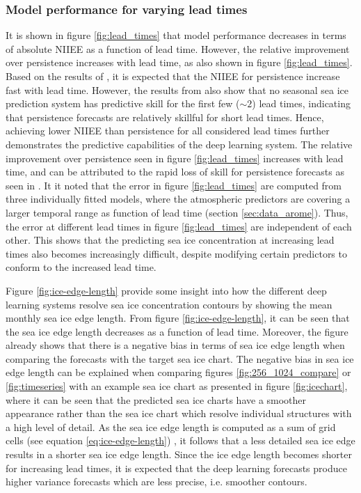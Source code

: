 \documentclass[../main/thesis]{subfiles}
\begin{document}
\subsubsection{Model performance for varying lead times}
\label{sec:discuss_perf_leadtimes}
It is shown in figure \ref{fig:lead_times} that model performance decreases in terms of absolute NIIEE as a function of lead time. However, the relative improvement over persistence increases with lead time, as also shown in figure \ref{fig:lead_times}. Based on the results of \citet{Zampieri2019}, it is expected that the NIIEE for persistence increase fast with lead time. However, the results from \citet{Zampieri2019} also show that no seasonal sea ice prediction system has predictive skill for the first few ($\sim 2$) lead times, indicating that persistence forecasts are relatively skillful for short lead times. Hence, achieving lower NIIEE than persistence for all considered lead times further demonstrates the predictive capabilities of the deep learning system. The relative improvement over persistence seen in figure \ref{fig:lead_times} increases with lead time, and can be attributed to the rapid loss of skill for persistence forecasts as seen in \citep{Zampieri2019}. It it noted that the error in figure \ref{fig:lead_times} are computed from three individually fitted models, where the atmospheric predictors are covering a larger temporal range as function of lead time (section \ref{sec:data_arome}). Thus, the error at different lead times in figure \ref{fig:lead_times} are independent of each other. This shows that the predicting sea ice concentration at increasing lead times also becomes increasingly difficult, despite modifying certain predictors to conform to the increased lead time.

Figure \ref{fig:ice-edge-length} provide some insight into how the different deep learning systems resolve sea ice concentration contours by showing the mean monthly sea ice edge length. From figure \ref{fig:ice-edge-length}, it can be seen that the sea ice edge length decreases as a function of lead time. Moreover, the figure already shows that there is a negative bias in terms of sea ice edge length when comparing the forecasts with the target sea ice chart. The negative bias in sea ice edge length can be explained when comparing figures \ref{fig:256_1024_compare} or \ref{fig:timeseries} with an example sea ice chart as presented in figure \ref{fig:icechart}, where it can be seen that the predicted sea ice charts have a smoother appearance rather than the sea ice chart which resolve individual structures with a high level of detail. As the sea ice edge length is computed as a sum of grid cells (see equation \ref{eq:ice-edge-length}) \citep{Melsom2019}, it follows that a less detailed sea ice edge results in a shorter sea ice edge length. Since the ice edge length becomes shorter for increasing lead times, it is expected that the deep learning forecasts produce higher variance forecasts which are less precise, i.e. smoother contours.
\end{document}
